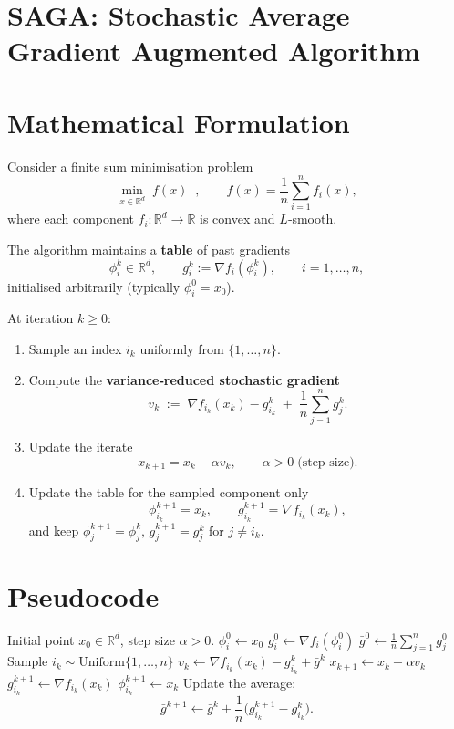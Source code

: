 \documentclass{article}
\begin{document}
\section*{SAGA: Stochastic Average Gradient Augmented Algorithm}

\section*{Mathematical Formulation}
Consider a finite sum minimisation problem  
\[
\min_{x\in\mathbb{R}^d} \; f(x)\;\;,\qquad 
f(x)=\frac{1}{n}\sum_{i=1}^{n} f_i(x),
\]
where each component $f_i:\mathbb{R}^d\to\mathbb{R}$ is convex and $L$‑smooth.  

The algorithm maintains a {\bf table} of past gradients 
\[
\phi_i^{k}\in\mathbb{R}^d,\qquad 
g_i^{k}:=\nabla f_i(\phi_i^{k}) ,\qquad i=1,\dots ,n,
\]
initialised arbitrarily (typically $\phi_i^{0}=x_0$).  

At iteration $k\ge 0$:

\begin{enumerate}[label=\arabic*.]
\item Sample an index $i_k$ uniformly from $\{1,\dots ,n\}$.
\item Compute the {\bf variance‑reduced stochastic gradient}
\[
v_k \;:=\; \nabla f_{i_k}(x_k)-g_{i_k}^{k}
        \;+\;\frac{1}{n}\sum_{j=1}^{n} g_{j}^{k}.
\tag{1}
\]
\item Update the iterate
\[
x_{k+1}=x_k-\alpha v_k, \qquad \alpha>0\;\text{(step size)}.
\tag{2}
\]
\item Update the table for the sampled component only
\[
\phi_{i_k}^{k+1}=x_k,\qquad 
g_{i_k}^{k+1}= \nabla f_{i_k}(x_k),
\]
and keep $\phi_j^{k+1}=\phi_j^{k},\, g_j^{k+1}=g_j^{k}$ for $j\neq i_k$.
\end{enumerate}

\section*{Pseudocode}
\begin{algorithm}[H]
\caption{SAGA}
\begin{algorithmic}[1]
\REQUIRE Initial point $x_0\in\mathbb{R}^d$, step size $\alpha>0$.
    \STATE $\phi_i^0\gets x_0$ 
    \STATE $g_i^0\gets \nabla f_i(\phi_i^0)$
\ENDFOR
\STATE $\bar g^0 \gets \frac1n\sum_{j=1}^n g_j^0$ 
    \STATE Sample $i_k\sim\text{Uniform}\{1,\dots,n\}$
    \STATE $v_k \gets \nabla f_{i_k}(x_k)-g_{i_k}^{k}+ \bar g^{k}$ \label{line:vk}
    \STATE $x_{k+1}\gets x_k-\alpha v_k$
    \STATE $g_{i_k}^{k+1}\gets \nabla f_{i_k}(x_k)$
    \STATE $\phi_{i_k}^{k+1}\gets x_k$
    \STATE Update the average:
    \[
    \bar g^{k+1}\gets \bar g^{k}
          +\frac{1}{n}\bigl(g_{i_k}^{k+1}-g_{i_k}^{k}\bigr).
    \]
\ENDFOR
\end{algorithmic}
\end{algorithm}
\end{document}
